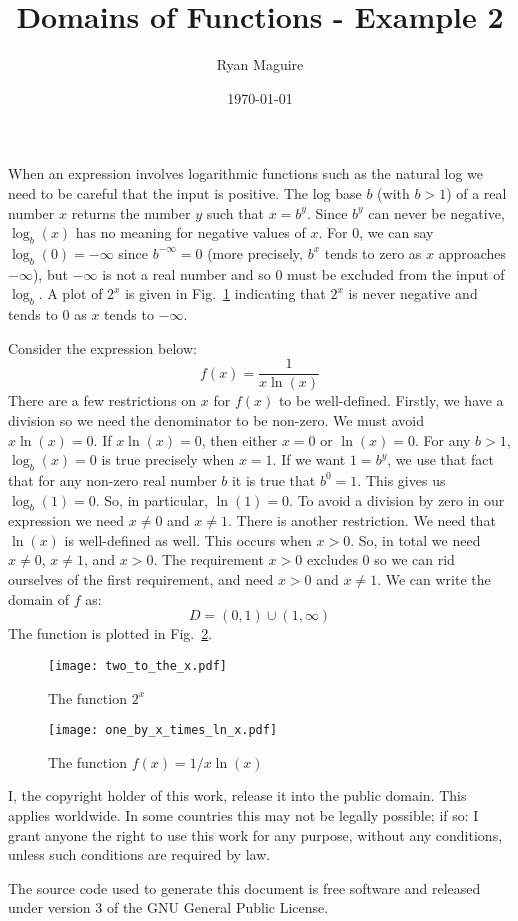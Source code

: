 \documentclass{article}
\title{Domains of Functions - Example 2}
\author{Ryan Maguire}
\date{\today}
\begin{document}
    \maketitle
    When an expression involves logarithmic functions such as the natural
    log we need to be careful that the input is positive. The log base
    $b$ (with $b>1$) of a real number $x$ returns the number $y$ such that
    $x=b^{y}$. Since $b^{y}$ can never be negative, $\log_{b}(x)$ has no
    meaning for negative values of $x$. For 0, we can say
    $\log_{b}(0)=-\infty$ since $b^{-\infty}=0$ (more precisely, $b^{x}$ tends
    to zero as $x$ approaches $-\infty$), but $-\infty$ is not a real
    number and so 0 must be excluded from the input of $\log_{b}$.
    A plot of $2^{x}$ is given in Fig.~\ref{fig:two_to_the_x} indicating that
    $2^{x}$ is never negative and tends to $0$ as $x$ tends to $-\infty$.
    \par\hfill\par
    Consider the expression below:
    \begin{equation}
        f(x)=\frac{1}{x\ln(x)}
    \end{equation}
    There are a few restrictions on $x$ for $f(x)$ to be well-defined. Firstly,
    we have a division so we need the denominator to be non-zero. We must
    avoid $x\ln(x)=0$. If $x\ln(x)=0$, then either $x=0$ or $\ln(x)=0$. For
    any $b>1$, $\log_{b}(x)=0$ is true precisely when $x=1$. If we want
    $1=b^{y}$, we use that fact that for any non-zero real number $b$ it is
    true that $b^{0}=1$. This gives us $\log_{b}(1)=0$. So, in particular,
    $\ln(1)=0$. To avoid a division by zero in our expression we need
    $x\ne{0}$ and $x\ne{1}$. There is another restriction. We need that
    $\ln(x)$ is well-defined as well. This occurs when $x>0$. So, in total
    we need $x\ne{0}$, $x\ne{1}$, and $x>0$. The requirement $x>0$ excludes
    0 so we can rid ourselves of the first requirement, and need
    $x>0$ and $x\ne{1}$. We can write the domain of $f$ as:
    \begin{equation}
        D=(0,1)\cup(1,\infty)
    \end{equation}
    The function is plotted in Fig.~\ref{fig:one_by_x_lnx}.
    \begin{figure}
        \centering
        \texttt{[image: two\_to\_the\_x.pdf]}
        \caption{The function $2^{x}$}
        \label{fig:two_to_the_x}
    \end{figure}
    \begin{figure}
        \centering
        \texttt{[image: one\_by\_x\_times\_ln\_x.pdf]}
        \caption{The function $f(x)=1/x\ln(x)$}
        \label{fig:one_by_x_lnx}
    \end{figure}
    \newpage
    I, the copyright holder of this work, release it into the public domain.
    This applies worldwide. In some countries this may not be legally possible;
    if so: I grant anyone the right to use this work for any purpose, without
    any conditions, unless such conditions are required by law.
    \par\hfill\par
    The source code used to generate this document is free software and released
    under version 3 of the GNU General Public License.
\end{document}
